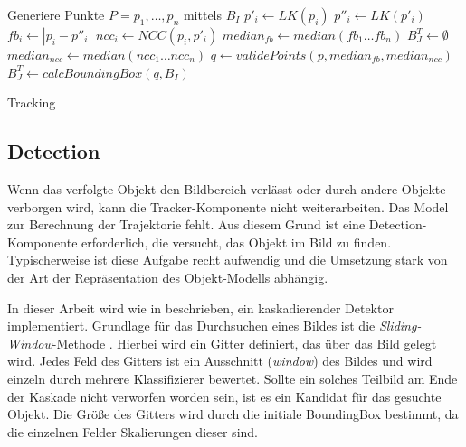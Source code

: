 	\begin{algorithm}[H]
	\vspace{0.2cm}
	Generiere Punkte $P = p_{1},\ldots,p_{n}$ mittels $B_{I}$\;
	 {
		$p'_{i} \leftarrow LK(p_{i})$\;
		$p''_{i} \leftarrow LK(p'_{i})$\;
		$fb_{i} \leftarrow |p_{i}-p''_{i}|$\;
		$ncc_{i} \leftarrow NCC(p_{i},p'_{i})$\;
	}
	$median_{fb}\leftarrow median(fb_{1}\ldots fb_{n})$\;
	 {
		$B_{J}^T \leftarrow \emptyset$\;
	} {
		$median_{ncc} \leftarrow median(ncc_{1}\dots ncc_{n})$\;
		$q \leftarrow validePoints(p,median_{fb},median_{ncc})$\;
		$B_{J}^T \leftarrow calcBoundingBox(q,B_{I})$\;
	}
	\caption{Tracking}
	\label{alg:tracking}
	\vspace{0.2cm}
	\end{algorithm}

	\subsection{Detection}
	\label{subsection:detection}
	Wenn das verfolgte Objekt den Bildbereich verlässt oder durch andere Objekte verborgen wird, kann die Tracker-Komponente nicht weiterarbeiten. Das Model zur Berechnung der Trajektorie fehlt. Aus diesem Grund ist eine Detection-Komponente erforderlich, die versucht, das Objekt im Bild zu finden. Typischerweise ist diese Aufgabe recht aufwendig und die Umsetzung stark von der Art der Repräsentation des Objekt-Modells abhängig.

	In dieser Arbeit wird wie in \cite{TLD} beschrieben, ein kaskadierender Detektor implementiert. Grundlage für das Durchsuchen eines Bildes ist die \textit{Sliding-Window}-Methode \cite{key-6}. Hierbei wird ein Gitter definiert, das über das Bild gelegt wird. Jedes Feld des Gitters ist ein Ausschnitt (\textit{window}) des Bildes und wird einzeln durch mehrere Klassifizierer bewertet. Sollte ein solches Teilbild am Ende der Kaskade nicht verworfen worden sein, ist es ein Kandidat für das gesuchte Objekt. Die Größe des Gitters wird durch die initiale BoundingBox bestimmt, da die einzelnen Felder Skalierungen dieser sind.

